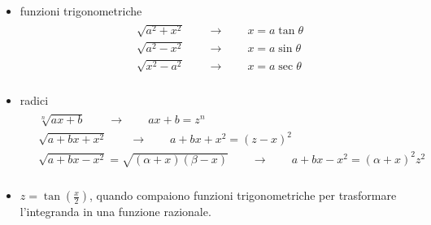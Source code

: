\documentclass[letterpaper,10pt,italian]{jupyterBook}
\begin{document}
\sphinxAtStartPar
{}
\begin{itemize}
\item {} 
\sphinxAtStartPar
funzioni trigonometriche  
\begin{equation*}
\begin{split}\begin{aligned}
    & \sqrt{a^2 + x^2} \qquad \rightarrow \qquad x = a \tan \theta \\
    & \sqrt{a^2 - x^2} \qquad \rightarrow \qquad x = a \sin \theta \\
    & \sqrt{x^2 - a^2} \qquad \rightarrow \qquad x = a \sec \theta \\
  \end{aligned}\end{split}
\end{equation*}
\item {} 
\sphinxAtStartPar
radici
\begin{equation*}
\begin{split}\begin{aligned}
    & \sqrt[n]{ax + b} \qquad \rightarrow \qquad ax + b = z^n \\
    & \sqrt{a + bx + x^2} \qquad \rightarrow \qquad a + bx + x^2 = ( z - x )^2 \\
    & \sqrt{a + bx - x^2} = \sqrt{(\alpha + x)(\beta - x)} \qquad \rightarrow \qquad a + bx - x^2 = ( \alpha + x )^2 z^2 \\
  \end{aligned}\end{split}
\end{equation*}
\item {} 
\sphinxAtStartPar
\(z = \tan\left( \frac{x}{2} \right)\), quando compaiono funzioni trigonometriche per trasformare l’integranda in una funzione razionale.


\end{itemize}
\end{document}
